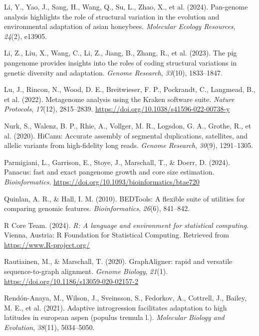 \documentclass[
]{agujournal2019}
\newlength{\cslhangindent}
\newenvironment{CSLReferences}[2] %
 {\begin{list}{}{%
  \setlength{\itemindent}{0pt}
  \setlength{\leftmargin}{0pt}
  \setlength{\parsep}{0pt}
  \ifodd #1
   \setlength{\leftmargin}{\cslhangindent}
   \setlength{\itemindent}{-1\cslhangindent}
  \fi
  \setlength{\itemsep}{#2\baselineskip}}}
 {\end{list}}
\begin{document}
\begin{CSLReferences}{1}{0}
Li, Y., Yao, J., Sang, H., Wang, Q., Su, L., Zhao, X., et al. (2024).
Pan-genome analysis highlights the role of structural variation in the
evolution and environmental adaptation of asian honeybees.
\emph{Molecular Ecology Resources}, \emph{24}(2), e13905.

Li, Z., Liu, X., Wang, C., Li, Z., Jiang, B., Zhang, R., et al. (2023).
The pig pangenome provides insights into the roles of coding structural
variations in genetic diversity and adaptation. \emph{Genome Research},
\emph{33}(10), 1833--1847.

Lu, J., Rincon, N., Wood, D. E., Breitwieser, F. P., Pockrandt, C.,
Langmead, B., et al. (2022). Metagenome analysis using the Kraken
software suite. \emph{Nature Protocols}, \emph{17}(12), 2815--2839.
\url{https://doi.org/10.1038/s41596-022-00738-y}

Nurk, S., Walenz, B. P., Rhie, A., Vollger, M. R., Logsdon, G. A.,
Grothe, R., et al. (2020). HiCanu: Accurate assembly of segmental
duplications, satellites, and allelic variants from high-fidelity long
reads. \emph{Genome Research}, \emph{30}(9), 1291--1305.

Parmigiani, L., Garrison, E., Stoye, J., Marschall, T., \& Doerr, D.
(2024). Panacus: fast and exact pangenome growth and core size
estimation. \emph{Bioinformatics}.
\url{https://doi.org/10.1093/bioinformatics/btae720}

Quinlan, A. R., \& Hall, I. M. (2010). BEDTools: A flexible suite of
utilities for comparing genomic features. \emph{Bioinformatics},
\emph{26}(6), 841--842.

R Core Team. (2024). \emph{R: A language and environment for statistical
computing}. Vienna, Austria: R Foundation for Statistical Computing.
Retrieved from \url{https://www.R-project.org/}

Rautiainen, M., \& Marschall, T. (2020). GraphAligner: rapid and
versatile sequence-to-graph alignment. \emph{Genome Biology},
\emph{21}(1). \url{https://doi.org/10.1186/s13059-020-02157-2}

Rendón-Anaya, M., Wilson, J., Sveinsson, S., Fedorkov, A., Cottrell, J.,
Bailey, M. E., et al. (2021). Adaptive introgression facilitates
adaptation to high latitudes in european aspen (populus tremula l.).
\emph{Molecular Biology and Evolution}, \emph{38}(11), 5034--5050.


\end{CSLReferences}
\end{document}
